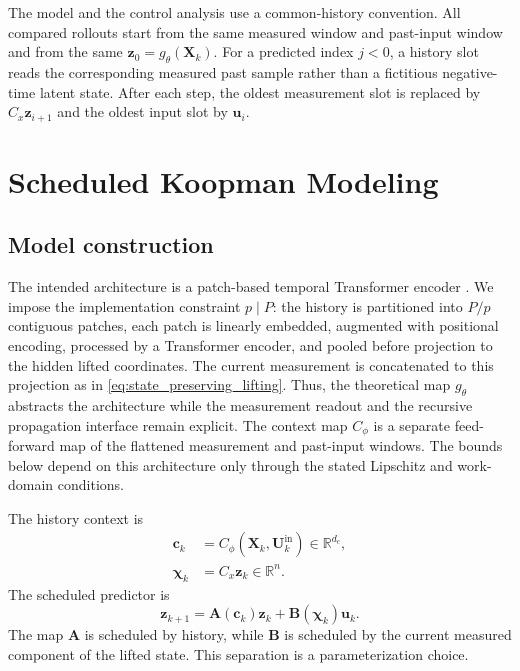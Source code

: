 \documentclass[journal]{IEEEtran}
\newcommand{\vu}{\mathbf{u}}
\newcommand{\vz}{\mathbf{z}}
\newcommand{\vc}{\mathbf{c}}
\newcommand{\vchi}{\boldsymbol{\chi}}
\newcommand{\mA}{\mathbf{A}}
\newcommand{\mB}{\mathbf{B}}
\newcommand{\mU}{\mathbf{U}}
\newcommand{\mX}{\mathbf{X}}
\newcommand{\R}{\mathbb{R}}
\begin{document}
The model and the control analysis use a common-history convention. All compared rollouts start from the same measured window and past-input window and from the same $\vz_0=g_\theta(\mX_k)$. For a predicted index $j<0$, a history slot reads the corresponding measured past sample rather than a fictitious negative-time latent state. After each step, the oldest measurement slot is replaced by $C_x\vz_{i+1}$ and the oldest input slot by $\vu_i$.

\section{Scheduled Koopman Modeling}
\label{sec:model}

\subsection{Model construction}

The intended architecture is a patch-based temporal Transformer encoder \cite{vaswani2017attention,nie2023time}. We impose the implementation constraint $p\mid P$: the history is partitioned into $P/p$ contiguous patches, each patch is linearly embedded, augmented with positional encoding, processed by a Transformer encoder, and pooled before projection to the hidden lifted coordinates. The current measurement is concatenated to this projection as in \eqref{eq:state_preserving_lifting}. Thus, the theoretical map $g_\theta$ abstracts the architecture while the measurement readout and the recursive propagation interface remain explicit. The context map $C_\phi$ is a separate feed-forward map of the flattened measurement and past-input windows. The bounds below depend on this architecture only through the stated Lipschitz and work-domain conditions.

The history context is
\begin{align}
    \vc_k&=C_\phi(\mX_k,\mU_k^{\mathrm{in}})\in\R^{d_c},
    \label{eq:history_context}\\
    \vchi_k&=C_x\vz_k\in\R^n.
    \label{eq:scheduling_variables}
\end{align}
The scheduled predictor is
\begin{equation}
    \vz_{k+1}=\mA(\vc_k)\vz_k+\mB(\vchi_k)\vu_k.
    \label{eq:scheduled_predictor}
\end{equation}
The map $\mA$ is scheduled by history, while $\mB$ is scheduled by the current measured component of the lifted state. This separation is a parameterization choice.
\end{document}
